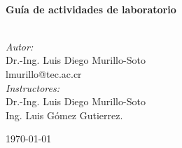 \begin{titlepage}
	
	\HRule \\[0.4cm]
	{ \large \bfseries Gu\'ia de actividades de laboratorio}\\[0.4cm] %
	\HRule \\[1cm]
	
	
	\begin{minipage}{0.5\textwidth}
		\begin{flushleft} \large
			\emph{Autor:}\\
			Dr.-Ing. Luis Diego Murillo-Soto\\ %
			lmurillo@tec.ac.cr \\ [0.5cm]
			
			\emph{Instructores:} \\
			Dr.-Ing. Luis Diego Murillo-Soto \\ 
			Ing. Luis G\'omez Gutierrez. \\[0.5cm] %
		\end{flushleft}
	\end{minipage}
	\vspace{2cm}		
	
	{\large \today}\\[0.5cm] %
	
	
	\vfill %
	
\end{titlepage}





